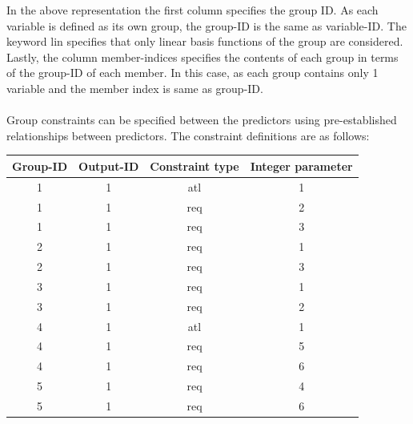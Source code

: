 \documentclass[a4paper,12pt]{article}
\begin{document}
In the above representation the first column specifies the group ID. As each variable is defined as its own group, the group-ID is the same as variable-ID. The keyword lin specifies that only linear basis functions of the group are considered. Lastly, the column member-indices specifies the contents of each group in terms of the group-ID of each member. In this case, as each group contains only 1 variable and the member index is same as group-ID.\\ \\
Group constraints can be specified between the predictors using pre-established relationships between predictors. The constraint definitions are as follows:

\begin{table}[H]
\centering
\begin{tabular}{|c|c|c|c|}
\hline
\textbf{Group-ID} & \textbf{Output-ID} & \textbf{Constraint type} & \textbf{Integer parameter} \\ \hline
1                 & 1                  & atl                      & 1                          \\
1                 & 1                  & req                      & 2                          \\
1                 & 1                  & req                      & 3                          \\
2                 & 1                  & req                      & 1                          \\
2                 & 1                  & req                      & 3                          \\
3                 & 1                  & req                      & 1                          \\
3                 & 1                  & req                      & 2                          \\ \hline
4                 & 1                  & atl                      & 1                          \\
4                 & 1                  & req                      & 5                          \\
4                 & 1                  & req                      & 6                          \\
5                 & 1                  & req                      & 4                          \\
5                 & 1                  & req                      & 6                          \\

\end{tabular}
\end{table}
\end{document}
